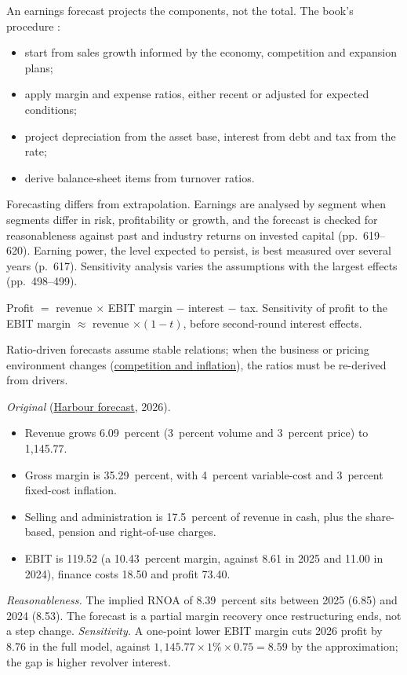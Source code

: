 \begin{qfmethod}\label{meth:ratio-based-earnings-forecast}
 An earnings forecast projects the components, not the total. The book's procedure \citep[pp.~492--498]{financial-statement-analysis-2009}:
\begin{itemize}
\item start from sales growth informed by the economy, competition and expansion plans;
\item apply margin and expense ratios, either recent or adjusted for expected conditions;
\item project depreciation from the asset base, interest from debt and tax from the rate;
\item derive balance-sheet items from turnover ratios.
\end{itemize}
Forecasting differs from extrapolation. Earnings are analysed by segment when segments differ in risk, profitability or growth, and the forecast is checked for reasonableness against past and industry returns on invested capital (pp.~619--620). Earning power, the level expected to persist, is best measured over several years (p.~617). Sensitivity analysis varies the assumptions with the largest effects (pp.~498--499).

 Profit $=$ revenue $\times$ EBIT margin $-$ interest $-$ tax. Sensitivity of profit to the EBIT margin $\approx$ revenue $\times(1-t)$, before second-round interest effects.

 Ratio-driven forecasts assume stable relations; when the business or pricing environment changes (\hyperref[meth:competition-inflation-forecasting]{competition and inflation}), the ratios must be re-derived from drivers.

 \emph{Original} (\hyperref[ex:harbour-pro-forma-model]{Harbour forecast}, 2026).
\begin{itemize}
\item Revenue grows 6.09~percent (3~percent volume and 3~percent price) to 1{,}145.77.
\item Gross margin is 35.29~percent, with 4~percent variable-cost and 3~percent fixed-cost inflation.
\item Selling and administration is 17.5~percent of revenue in cash, plus the share-based, pension and right-of-use charges.
\item EBIT is 119.52 (a 10.43~percent margin, against 8.61 in 2025 and 11.00 in 2024), finance costs 18.50 and profit 73.40.
\end{itemize}
\emph{Reasonableness.} The implied RNOA of 8.39~percent sits between 2025 (6.85) and 2024 (8.53). The forecast is a partial margin recovery once restructuring ends, not a step change. \emph{Sensitivity.} A one-point lower EBIT margin cuts 2026 profit by 8.76 in the full model, against $1{,}145.77\times1\%\times0.75=8.59$ by the approximation; the gap is higher revolver interest.


\end{qfmethod}
